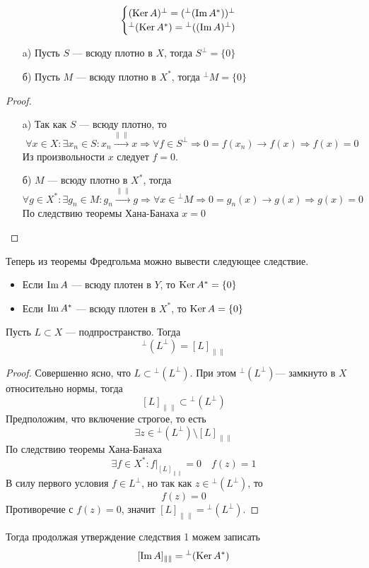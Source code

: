 \begin{next1}
	$$\begin{cases}
		(\operatorname{Ker} A)^\perp = ({}^\perp(\operatorname{Im} A^*))^\perp \\{}^\perp(\operatorname{Ker} A^*) =  {}^\perp((\operatorname{Im} A)^\perp) 
	\end{cases}$$
\end{next1}
{\footnotesize \color{violet}
\begin{lemma}\label{lem:densyty}
	\hfill
	\begin{enumerate}
		\item[a)] 	Пусть $S$ --- всюду плотно в $X$, тогда $S^\perp = \{0\}$
		\item[б)] Пусть $M$ --- всюду плотно в $X^*$, тогда $^\perp M  = \{0\}$
	\end{enumerate}
\end{lemma}
\begin{proof}
	\begin{enumerate}
		\item[a)] Так как $S$ --- всюду плотно, то
		$$
		\forall x \in X \colon \exists x_n \in S\colon x_n \xrightarrow{\|\|} x \Rightarrow \forall f \in S^\perp \Rightarrow 0  = f(x_n) \to f(x) \Rightarrow f(x) = 0
		$$
		Из произвольности $x$ следует  $f = 0 $. 
		\item[б)] $M$ --- всюду плотно в $X^*$, тогда
		$$
		\forall g \in X^*: \exists g_n \in M \colon g_n \xrightarrow{\|\|} g \Rightarrow \forall x \in {}^\perp M \Rightarrow 0  = g_n(x) \to g(x) \Rightarrow g(x) = 0
		$$
		По следствию теоремы Хана-Банаха $x = 0$
	\end{enumerate}
\end{proof}
Теперь из теоремы Фредгольма можно вывести следующее следствие.
\begin{next2}\label{n:fr1}
	\hfill
	\begin{itemize}
		\item Если $\operatorname{Im} A$ --- всюду плотен в $Y$, то $ \operatorname{Ker} A^* = \{0\}$
		\item 	Если $\operatorname{Im} A^*$ --- всюду плотен в $X^*$, то $\operatorname{Ker} A = \{0\}$
	\end{itemize}
\end{next2}
}

\begin{lemma}\label{lem:doubleann1}
	Пусть $L \subset X$ --- подпространство. Тогда
	$$
	{}^\perp(L^\perp) = [L]_{\|\|}
	$$
\end{lemma}
\begin{proof}
	Совершенно ясно, что $L \subset {}^\perp(L^\perp)$. При этом ${}^\perp(L^\perp)$--- замкнуто в $X$ относительно нормы, тогда 
	$$
	[L]_{\|\|} \subset  {}^\perp(L^\perp)
	$$
	Предположим, что включение строгое, то есть 
	$$
	\exists z \in  {}^\perp(L^\perp) \setminus [L]_{\|\|}
	$$
	По следствию теоремы Хана-Банаха 
	$$
	\exists f \in X^* \colon f\big|_{[L]_{\|\|}} = 0 \quad f(z) = 1
	$$
	В силу первого условия $f \in L^\perp$, но  так как $z \in  {}^\perp(L^\perp)$, то 
	$$
	f(z) = 0
	$$
	Противоречие с $f(z) = 0$, значит $[L]_{\|\|} =  {}^\perp(L^\perp)$.
\end{proof}
Тогда продолжая утверждение следствия 1 можем записать 
$$
[\operatorname{Im} A]_{\|\|} = {}^\perp (\operatorname{Ker} A^*)
$$

